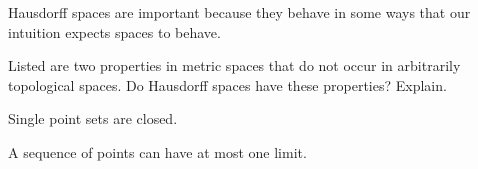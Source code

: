 
Hausdorff spaces are important because they behave in some ways that our intuition expects spaces to behave. 



\begin{activity} \label{act:Hausdorff} Listed are two properties in metric spaces that do not occur in arbitrarily topological spaces. Do Hausdorff spaces have these properties? Explain. 
\ba
\item Single point sets are closed.



\item A sequence of points can have at most one limit.



\ea

\end{activity}





%



